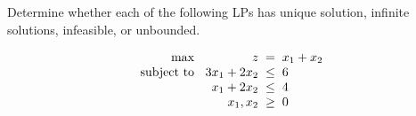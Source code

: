 \documentclass[a4paper, 10pt]{article}
\begin{document}
\begin{problem}
Determine whether each of the following LPs has unique solution, infinite solutions, infeasible, or unbounded.
\end{problem}

\begin{subproblems_alpha}
    \item
    \[
    \begin{array}{@{\hspace{2mm}} r @{\hspace{2mm}} r @{\hspace{2mm}} c @{\hspace{2mm}} l}
        \text{max } & z & = & x_1 + x_2 \\
        \text{subject to } & 3x_1 + 2x_2 & \leq & 6 \\
        & x_1 + 2x_2 & \leq & 4 \\
        & x_1, x_2 & \geq & 0
    \end{array}
    \]
\end{subproblems_alpha}
\end{document}
